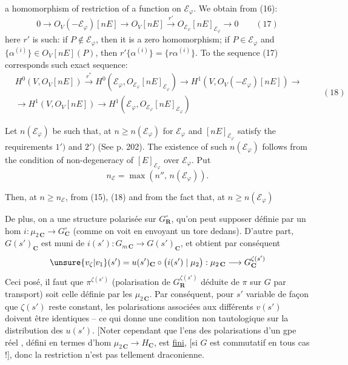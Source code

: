 
a homomorphism of restriction of a function on $\mathcal E_{\varphi}$. We obtain from (16):
\[
0\to O_V(-\mathcal E_{\varphi})[nE]\to O_V[nE]\xrightarrow{r'}O_{\mathcal E_{\varphi}}[nE]_{\mathcal E_{\varphi}}\to 0\qquad(17)
\]
here $r'$ is such: if $P\notin\mathcal E_{\varphi}$, then it is a zero homomorphism; if $P\in\mathcal E_{\varphi}$ and $\{\alpha^{(i)}\}\in O_V[nE](P)$, then $r'\{\alpha^{(i)}\}=\{r\alpha^{(i)}\}$. To the sequence (17) corresponds such exact sequence:
\[
\begin{aligned}
&H^0(V,O_V[nE])\xrightarrow{r^*} H^0(\mathcal E_{\varphi},O_{\mathcal E_{\varphi}}[nE]_{\mathcal E_{\varphi}})\to H^1(V,O_V(-\mathcal E_{\varphi})[nE])\to\\
&\to H^1(V,O_V[nE])\to H^1(\mathcal E_{\varphi},O_{\mathcal E_{\varphi}}[nE]_{\mathcal E_{\varphi}})
\end{aligned}
\qquad(18)
\]

Let $n(\mathcal E_{\varphi})$ be such that, at $n\geq n(\mathcal E_{\varphi})$ for $\mathcal E_{\varphi}$ and $[nE]_{\mathcal E_{\varphi}}$ satisfy the requirements $1')$ and $2')$ (See p. 202). The existence of such $n(\mathcal E_{\varphi})$ follows from the condition of non-degeneracy of $[E]_{\mathcal E_{\varphi}}$ over $\mathcal E_{\varphi}$. Put
\[
n_{\mathcal E}=\max(n'',\,n(\mathcal E_{\varphi})).
\]

Then, at $n\geq n_{\mathcal E}$, from (15), (18) and from the fact that, at $n\geq n(\mathcal E_{\varphi})$

De plus, on a une structure polarisée\inserted{ $\pi$} sur $G_{\mathbf R}^{\circ}$, qu'on peut  supposer définie par un hom  $i:\mu_{2\,\mathbf C}\longrightarrow G_{\mathbf C}^{\circ}$ (comme on voit en envoyant un tore  dedans). D'autre part, $G(s')_{\mathbf C}$ est muni de $i(s'):G_{m\,\mathbf C}\to G(s')_{\mathbf C}$, et  obtient par conséquent
\[
\unsure{v_{\zeta}|v_1}(s')=u(s')_{\mathbf C}\circ\bigl(i(s')\mid\mu_2\bigr):\mu_{2\,\mathbf C}\longrightarrow G_{\mathbf C}^{\zeta(s')}
\]
 Ceci posé, il faut que $\pi^{\zeta(s')}$ (polarisation de $G_{\mathbf R}^{\zeta(s')}$ déduite de $\pi$ sur $G$ par transport) soit celle définie par les $\mu_{2\,\mathbf C}$. Par conséquent, pour $s'$ variable de façon que $\zeta(s')$ reste constant, les polarisations  associées aux différents $v(s')$ doivent être identiques -- ce qui donne une condition non tautologique sur la distribution des  $u(s')$. [Noter cependant que l'ens des  polarisations d'un gpe réel , défini en termes d'hom $\mu_{2\,\mathbf C}\to H_{\mathbf C}$,  est \uline{fini}, [si $G$ est commutatif en tous cas !], donc la restriction n'est pas tellement draconienne.

